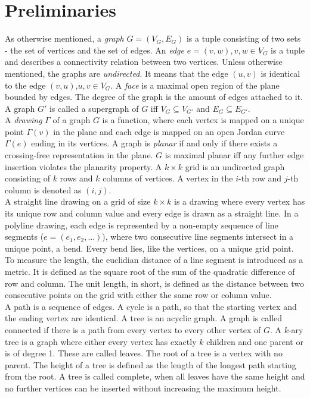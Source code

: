 \section{Preliminaries}
As otherwise mentioned, a \textit{graph} $G=(V_G,E_G)$ is a tuple consisting of two sets - the set of vertices and the set of edges. An \textit{edge} $e = (v,w), v,w \in V_G$ is a tuple and describes a connectivity relation between two vertices. Unless otherwise mentioned, the graphs are \textit{undirected}. It means that the edge $(u,v)$ is identical to the edge $(v,u)$,$u,v\in V_G$. A \textit{face} is a maximal open region of the plane bounded by edges. The degree of the graph is the amount of edges attached to it. A graph $G'$ is called a supergraph of $G$ iff $V_{G}\subseteq V_{G'}$ and $E_{G}\subseteq E_{G'}$. 
\bigskip\\
 A \textit{drawing} $\Gamma$ of a graph $G$ is a function, where each vertex is mapped on a unique point $\Gamma(v)$ in the plane and each edge is mapped on an open Jordan curve $\Gamma(e)$ ending in its vertices. A graph is \textit{planar} if and only if there exists a crossing-free representation in the plane. $G$ is maximal planar iff any further edge insertion violates the planarity property. A $k\times k$ grid is an undirected graph consisting of $k$ rows and $k$ columns of vertices. A vertex in the $i$-th row and $j$-th column is denoted as $(i,j)$.\\
 A straight line drawing on a grid of size $k\times k$ is a drawing where every vertex has its unique row and column value and every edge is drawn as a straight line. In a polyline drawing, each edge is represented by a non-empty sequence of line segments ($e = (e_1,e_2,...)$), where two consecutive line segments intersect in a unique point, a bend. Every bend lies, like the vertices, on a unique grid point.\bigskip\\
 To measure the length, the euclidian distance of a line segment is introduced as a metric. It is defined as the square root of the sum of the quadratic difference of row and column. The unit length, \UL in short, is defined as the distance between two consecutive points on the grid with either the same row or column value.\bigskip\\
 A path is a sequence of edges. A cycle is a path, so that the starting vertex and the ending vertex are identical. A tree is an acyclic graph. A graph is called connected if there is a path from every vertex to every other vertex of $G$. A $k$-ary tree is a graph where either every vertex has exactly $k$ children and one parent or is of degree 1. These are called leaves. The root of a tree is a vertex with no parent. The height of a tree is defined as the length of the longest path starting from the root. A tree is called complete, when all leaves have the same height and no further vertices can be inserted without increasing the maximum height.\bigskip\\
